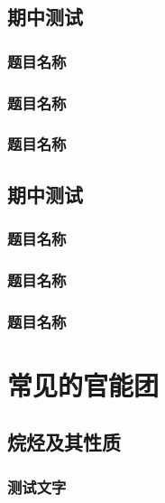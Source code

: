 \documentclass[color=orange,openany]{textbook-cn}
\begin{document}
\begin{Quiz}
\section{期中测试}
\subsection{题目名称}
\lipsum[1-5]
\subsection{题目名称}
\lipsum[1-5]
\subsection{题目名称}
\lipsum[1-5]
\end{Quiz}


\begin{Quiz}
\section{期中测试}
\subsection{题目名称}
\lipsum[1-5]
\subsection{题目名称}
\lipsum[1-5]
\subsection{题目名称}
\lipsum[1-5]
\end{Quiz}


\chapter{常见的官能团}

\section{烷烃及其性质}
\begin{Point}
\lipsum[1]
\end{Point}

\subsection{测试文字}
\end{document}
